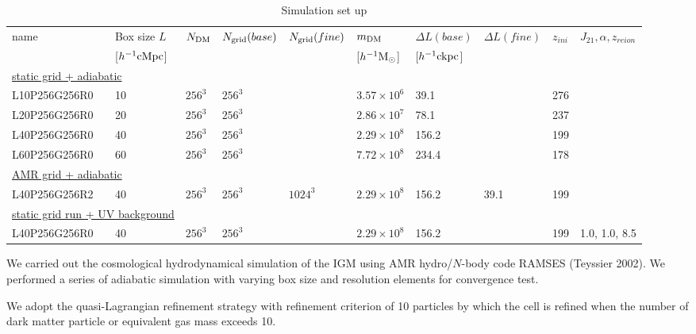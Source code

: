 \documentclass[useAMS,usenatbib,twocolumn]{mn2e}
\begin{document}
\begin{table}
\centering
\caption{Simulation set up}
\label{table:ramses}
\begin{tabular}{llllllllll}
\hline
name        & Box size $L$       & $N_{\rm{DM}}$ & $N_{\rm{grid}}(base)$ &  $N_{\rm{grid}}(fine)$   & $m_{\rm{DM}}$          &$\Delta L(base)$ & $\Delta L(fine)$  & $z_{ini}$ & $J_{21}, \alpha, z_{reion}$ \\ 
            & [$h^{-1}\rm{cMpc}$] &             &                    &                       & [$h^{-1}\rm{M}_\odot$] &[$h^{-1}\rm{ckpc}$] &             \\
\hline
\multicolumn{2}{l}{\underline{static grid + adiabatic}} \\
L10P256G256R0 &  10              & $256^3$   & $256^3$     &     & $3.57\times10^6$      & 39.1       &        & 276  \\
L20P256G256R0 &  20              & $256^3$   & $256^3$     &    & $2.86\times10^7$      & 78.1        &       & 237   \\
L40P256G256R0 &  40              & $256^3$   & $256^3$     &    & $2.29\times10^8$      & 156.2       &       & 199   \\
L60P256G256R0 &  60              & $256^3$   & $256^3$     &    & $7.72\times10^8$      & 234.4       &       &  178   \\
\multicolumn{2}{l}{\underline{AMR grid + adiabatic}} \\
L40P256G256R2 &  40              & $256^3$   & $256^3$     & $1024^3$   & $2.29\times10^8$      & 156.2      &  39.1      & 199   \\
\multicolumn{2}{l}{\underline{static grid run + UV background}} \\
L40P256G256R0 &  40              & $256^3$   & $256^3$     &    & $2.29\times10^8$      & 156.2       &       & 199   & 1.0, 1.0, 8.5 \\


\hline
\end{tabular}

\end{table}

We carried out the cosmological hydrodynamical simulation of the IGM using 
AMR hydro/$N$-body code RAMSES (Teyssier 2002). We performed a series of 
adiabatic simulation with varying box size and resolution elements for 
convergence test. 

We adopt the quasi-Lagrangian refinement strategy with refinement criterion 
of 10 particles by which the cell is refined when the number of dark matter 
particle or equivalent gas mass exceeds 10.  
\end{document}
